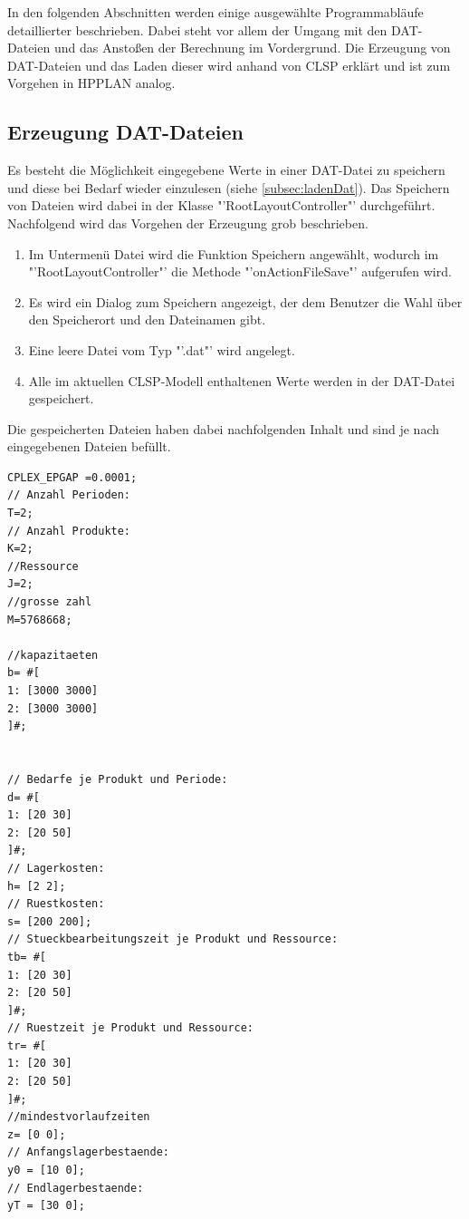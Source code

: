 \documentclass[12pt,a4paper, listof=entryprefix, bibliography=totocnumbered,toc=listofnumbered,lof=listofnumbered]{scrartcl}
\begin{document}
In den folgenden Abschnitten werden einige ausgewählte Programmabläufe detaillierter beschrieben. Dabei steht vor allem der Umgang mit den DAT-Dateien und das Anstoßen der Berechnung im Vordergrund. Die Erzeugung von DAT-Dateien und das Laden dieser wird anhand von CLSP erklärt und ist zum Vorgehen in HPPLAN analog. 

\subsection{Erzeugung DAT-Dateien}
Es besteht die Möglichkeit eingegebene Werte in einer DAT-Datei zu speichern und diese bei Bedarf wieder einzulesen (siehe \ref{subsec:ladenDat}). Das Speichern von Dateien wird dabei in der Klasse "'RootLayoutController"' durchgeführt. Nachfolgend wird das Vorgehen der Erzeugung grob beschrieben.

\begin{enumerate}
	\item Im Untermenü Datei wird die Funktion Speichern angewählt, wodurch im\\ "'RootLayoutController"' die Methode "'onActionFileSave"' aufgerufen wird.
	\item Es wird ein Dialog zum Speichern angezeigt, der dem Benutzer die Wahl über den Speicherort und den Dateinamen gibt.
	\item Eine leere Datei vom Typ "'.dat"' wird angelegt.
	\item Alle im aktuellen CLSP-Modell enthaltenen Werte werden in der DAT-Datei gespeichert.
\end{enumerate}

Die gespeicherten Dateien haben dabei nachfolgenden Inhalt und sind je nach eingegebenen Dateien befüllt.

\begin{lstlisting}[caption= Inhalt DAT-Datei, label=lst:dat]
CPLEX_EPGAP =0.0001;
// Anzahl Perioden:
T=2;
// Anzahl Produkte:
K=2;
//Ressource
J=2;
//grosse zahl
M=5768668;

//kapazitaeten
b= #[ 
1: [3000 3000]
2: [3000 3000]
]#;


// Bedarfe je Produkt und Periode:
d= #[ 
1: [20 30]
2: [20 50]
]#;
// Lagerkosten:
h= [2 2]; 
// Ruestkosten:
s= [200 200]; 
// Stueckbearbeitungszeit je Produkt und Ressource:
tb= #[ 
1: [20 30]
2: [20 50]
]#;
// Ruestzeit je Produkt und Ressource:
tr= #[ 
1: [20 30]
2: [20 50]
]#;
//mindestvorlaufzeiten
z= [0 0];
// Anfangslagerbestaende:
y0 = [10 0];
// Endlagerbestaende:
yT = [30 0];
\end{lstlisting}
\end{document}
